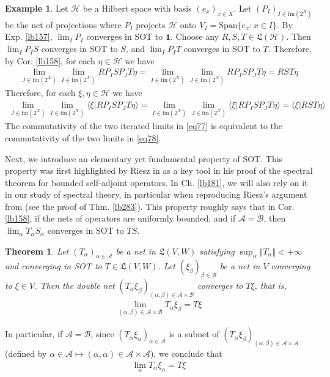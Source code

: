 \documentclass[12pt,b5paper,notitlepage]{article}
\theoremstyle{definition}
\newtheorem{eg}[df]{Example}
\theoremstyle{plain}
\newtheorem{thm}[df]{Theorem}
\newcommand{\fk}{\mathfrak}
\newcommand{\idt}{\mathbf{1}}
\newcommand{\Span}{\mathrm{Span}}
\newcommand{\bk}[1]{\langle {#1}\rangle}
\newcommand{\scr}{\mathscr}
\newcommand{\fin}{\mathrm{fin}}
\newcommand{\MH}{\mathcal H}
\newcommand{\SA}{\mathscr A}
\numberwithin{equation}{section}
\begin{document}
\begin{eg}\label{lb160}
Let $\MH$ be a Hilbert space with basis $(e_x)_{x\in X}$. Let $(P_I)_{I\in\fin(2^X)}$ be the net of projections where $P_I$ projects $\MH$ onto $V_I=\Span\{e_x:x\in I\}$. By Exp. \ref{lb157}, $\lim_I P_I$ converges in SOT to $\idt$. Choose any $R,S,T\in\fk L(\MH)$. Then $\lim_I P_IS$ converges in SOT to $S$, and $\lim_I P_IT$ converges in SOT to $T$. Therefore, by Cor. \ref{lb158}, for each $\eta\in\MH$ we have
\begin{align*}
\lim_{J\in\fin(2^X)}\lim_{I\in\fin(2^X)}RP_ISP_JT\eta=\lim_{I\in\fin(2^X)}\lim_{J\in\fin(2^X)}RP_ISP_JT\eta=RST\eta
\end{align*}
Therefore, for each $\xi,\eta\in\MH$ we have
\begin{align}\label{eq77}
\lim_{J\in\fin(2^X)}\lim_{I\in\fin(2^X)}\bk{\xi|RP_ISP_JT\eta}=\lim_{I\in\fin(2^X)}\lim_{J\in\fin(2^X)}\bk{\xi|RP_ISP_JT\eta}=\bk{\xi|RST\eta}
\end{align}
The commutativity of the two iterated limits in \eqref{eq77} is equivalent to the commutativity of the two limits in \eqref{eq78}.
\end{eg}




Next, we introduce an elementary yet fundamental property of SOT. This property was first highlighted by Riesz in \cite{Rie13} as a key tool in his proof of the spectral theorem for bounded self-adjoint operators. In Ch. \ref{lb181}, we will also rely on it in our study of spectral theory, in particular when reproducing Riesz's argument from \cite{Rie13} (see the proof of Thm. \ref{lb283}). This property roughly says that in Cor. \ref{lb158}, if the nets of operators are uniformly bounded, and if $\scr A=\scr B$, then $\lim_\alpha T_\alpha S_\alpha$ converges in SOT to $TS$.


\begin{thm}\label{lb155}
Let $(T_\alpha)_{\alpha\in\scr A}$ be a net in $\fk L(V,W)$ satisfying $\sup_\alpha\Vert T_\alpha\Vert<+\infty$ and converging in SOT to $T\in\fk L(V,W)$. Let $(\xi_\beta)_{\beta\in\scr B}$ be a net in $V$ converging to $\xi\in V$. Then the double net $(T_\alpha\xi_\beta)_{(\alpha,\beta)\in\scr A\times\scr B}$ converges to $T\xi$, that is,
\begin{align*}
\lim_{(\alpha,\beta)\in\scr A\times\scr B}T_\alpha\xi_\beta=T\xi
\end{align*}
\end{thm}

In particular, if $\scr A=\scr B$, since $(T_\alpha\xi_\alpha)_{\alpha\in\scr A}$ is a subnet of $(T_\alpha\xi_\beta)_{(\alpha,\beta)\in\scr A\times\scr A}$ (defined by $\alpha\in\scr A\mapsto(\alpha,\alpha)\in\SA\times\SA$), we conclude that
\begin{align*}
\lim_\alpha T_\alpha\xi_\alpha=T\xi
\end{align*}
\end{document}
